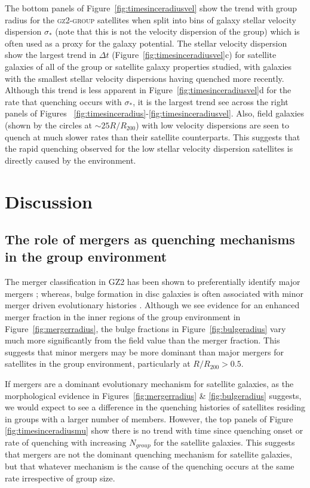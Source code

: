The bottom panels of Figure~\ref{fig:timesinceradiusvel} show the trend with group radius for the \textsc{gz2-group} satellites when split into bins of galaxy stellar velocity dispersion $\sigma_*$ (note that this is not the velocity dispersion of the group) which is often used as a proxy for the galaxy potential. The stellar velocity dispersion show the largest trend in $\Delta t$ (Figure~\ref{fig:timesinceradiusvel}c) for satellite galaxies of all of the group or satellite galaxy properties studied, with galaxies with the smallest stellar velocity dispersions having quenched more recently. Although this trend is less apparent in Figure~\ref{fig:timesinceradiusvel}d for the rate that quenching occurs with $\sigma_*$, it is the largest trend see across the right panels of Figures ~\ref{fig:timesinceradius}-\ref{fig:timesinceradiusvel}. Also, field galaxies (shown by the circles at $\sim 25 R/R_{200}$) with low velocity dispersions are seen to quench at much slower rates than their satellite counterparts. This suggests that the rapid quenching observed for the low stellar velocity dispersion satellites is directly caused by the environment. 

\section{Discussion}\label{sec:disc}

\subsection{The role of mergers as quenching mechanisms in the group environment}\label{sec:rolemergerenv}

The merger classification in GZ2 has been shown to preferentially identify major mergers \citep{Darg10a}; whereas, bulge formation in disc galaxies is often associated with minor merger driven evolutionary histories \citep{Croton06, tonini16}.  Although we see evidence for an enhanced merger fraction in the inner regions of the group environment in Figure~\ref{fig:mergerradius}, the bulge fractions in Figure~\ref{fig:bulgeradius} vary much more significantly from the field value than the merger fraction. This suggests that minor mergers may be more dominant than major mergers for satellites in the group environment, particularly at $R/R_{200} > 0.5$. 

If mergers are a dominant evolutionary mechanism for satellite galaxies, as the morphological evidence in Figures~\ref{fig:mergerradius} \& \ref{fig:bulgeradius} suggests, we would expect to see a difference in the quenching histories of satellites residing in groups with a larger number of members. However, the top panels of Figure \ref{fig:timesinceradiusmu} show there is no trend with time since quenching onset or rate of quenching with increasing $N_{group}$ for the satellite galaxies. This suggests that mergers are not the dominant quenching mechanism for satellite galaxies, but that whatever mechanism is the cause of the quenching occurs at the same rate irrespective of group size. 

